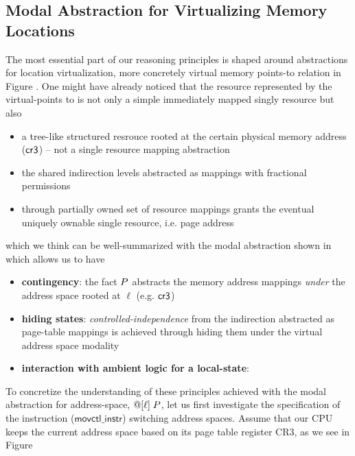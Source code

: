 \subsection{Modal Abstraction for Virtualizing Memory Locations}
\label{sec:modallocationvirtualization}

The most essential part of our reasoning principles is shaped around abstractions for location virtualization, more concretely virtual memory points-to relation in Figure . One might have already noticed that the resource represented by the virtual-points to is not only a simple immediately mapped singly resource but also
\begin{itemize}
\item a tree-like structured resrouce rooted at the certain physical memory address ($\mathsf{cr3}$) -- not a single resource mapping abstraction 
\item the shared indirection levels abstracted as mappings with fractional permissions
\item through partially owned set of resource mappings grants the eventual uniquely ownable single resource, i.e. page address 
\end{itemize}
which we think can be well-summarized with the modal abstraction shown in  which allows us to have
\begin{itemize}
  \item \textbf{contingency}: the fact $P$ abstracts the memory address mappings \textit{under} the address space rooted at $\ell$ (e.g. $\mathsf{cr3}$)
  \item \textbf{hiding states}: \textit{controlled-independence} from the indirection abstracted as page-table mappings is achieved through hiding them under the virtual address space modality
  \item \textbf{interaction with ambient logic for a local-state}: 
\end{itemize}

To concretize the understanding of these principles achieved with the modal abstraction for address-space, $@[\ell]\; P$, let us first investigate the specification of the instruction ($\textsf{movctl\_instr}$) switching address spaces. Assume that our CPU keeps the current address space based on its page table register CR3, as we see in Figure 


